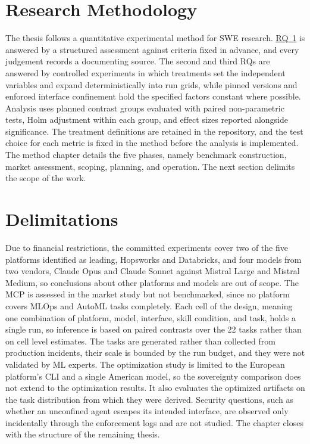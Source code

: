 \documentclass[
english,                 %
bibtex,                  %
]{kththesis}
\numberwithin{listing}{chapter}
\begin{document}
\section{Research Methodology}
\label{sec:intro_research_methodology}
\glsresetall

The thesis follows a quantitative experimental method for \gls{SWE} research. \hyperref[rq1]{\gls{RQ}~1} is answered by a structured assessment against criteria fixed in advance, and every judgement records a documenting source. The second and third \glspl{RQ} are answered by controlled experiments in which treatments set the independent variables and expand deterministically into run grids, while pinned versions and enforced interface confinement hold the specified factors constant where possible. Analysis uses planned contrast groups evaluated with paired non-parametric tests, Holm adjustment within each group, and effect sizes reported alongside significance. The treatment definitions are retained in the repository, and the test choice for each metric is fixed in the method before the analysis is implemented. The method chapter details the five phases, namely benchmark construction, market assessment, scoping, planning, and operation. The next section delimits the scope of the work.

\section{Delimitations}
\label{sec:intro_delimitations}
\glsresetall

Due to financial restrictions, the committed experiments cover two of the five platforms identified as leading, Hopsworks and Databricks, and four models from two vendors, Claude Opus and Claude Sonnet against Mistral Large and Mistral Medium, so conclusions about other platforms and models are out of scope. The \gls{MCP} is assessed in the market study but not benchmarked, since no platform covers \gls{MLOps} and \gls{AutoML} tasks completely. Each cell of the design, meaning one combination of platform, model, interface, skill condition, and task, holds a single run, so inference is based on paired contrasts over the 22 tasks rather than on cell level estimates. The tasks are generated rather than collected from production incidents, their scale is bounded by the run budget, and they were not validated by \gls{ML} experts. The optimization study is limited to the European platform's \gls{CLI} and a single American model, so the sovereignty comparison does not extend to the optimization results. It also evaluates the optimized artifacts on the task distribution from which they were derived. Security questions, such as whether an unconfined agent escapes its intended interface, are observed only incidentally through the enforcement logs and are not studied. The chapter closes with the structure of the remaining thesis.
\end{document}
